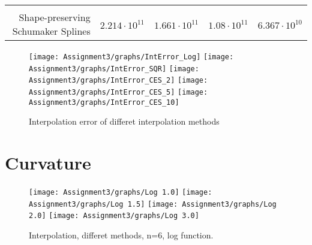 \documentclass[]{article}
\begin{document}
\begin{longtable}[]{@{}rrrrr@{}}
\begin{minipage}[t]{0.15\columnwidth}
\end{minipage}\tabularnewline
\begin{minipage}[t]{0.24\columnwidth}\raggedleft
Shape-preserving Schumaker Splines\strut
\end{minipage} & \begin{minipage}[t]{0.15\columnwidth}\raggedleft
\(2.214 \cdot 10^{11}\)\strut
\end{minipage} & \begin{minipage}[t]{0.15\columnwidth}\raggedleft
\(1.661 \cdot 10^{11}\)\strut
\end{minipage} & \begin{minipage}[t]{0.15\columnwidth}\raggedleft
\(1.08 \cdot 10^{11}\)\strut
\end{minipage} & \begin{minipage}[t]{0.15\columnwidth}\raggedleft
\(6.367 \cdot 10^{10}\)\strut
\end{minipage}\tabularnewline
\bottomrule
\end{longtable}

\begin{figure}

{\centering \texttt{[image: Assignment3/graphs/IntError\_Log]} \texttt{[image: Assignment3/graphs/IntError\_SQR]} \texttt{[image: Assignment3/graphs/IntError\_CES\_2]} \texttt{[image: Assignment3/graphs/IntError\_CES\_5]} \texttt{[image: Assignment3/graphs/IntError\_CES\_10]} 

}

\caption{Interpolation error of differet interpolation methods}\label{fig:unnamed-chunk-7}
\end{figure}

\hypertarget{curvature}{%
\section{Curvature}\label{curvature}}

\begin{figure}

{\centering \texttt{[image: Assignment3/graphs/Log 1.0]} \texttt{[image: Assignment3/graphs/Log 1.5]} \texttt{[image: Assignment3/graphs/Log 2.0]} \texttt{[image: Assignment3/graphs/Log 3.0]} 

}

\caption{Interpolation, differet methods, n=6, log function.}\label{fig:unnamed-chunk-8}
\end{figure}
\end{document}
